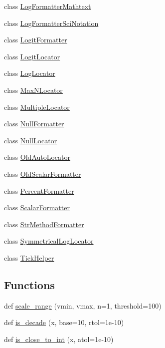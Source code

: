 \begin{DoxyCompactItemize}
\item 
class \hyperlink{classmatplotlib_1_1ticker_1_1LogFormatterMathtext}{Log\+Formatter\+Mathtext}
\item 
class \hyperlink{classmatplotlib_1_1ticker_1_1LogFormatterSciNotation}{Log\+Formatter\+Sci\+Notation}
\item 
class \hyperlink{classmatplotlib_1_1ticker_1_1LogitFormatter}{Logit\+Formatter}
\item 
class \hyperlink{classmatplotlib_1_1ticker_1_1LogitLocator}{Logit\+Locator}
\item 
class \hyperlink{classmatplotlib_1_1ticker_1_1LogLocator}{Log\+Locator}
\item 
class \hyperlink{classmatplotlib_1_1ticker_1_1MaxNLocator}{Max\+N\+Locator}
\item 
class \hyperlink{classmatplotlib_1_1ticker_1_1MultipleLocator}{Multiple\+Locator}
\item 
class \hyperlink{classmatplotlib_1_1ticker_1_1NullFormatter}{Null\+Formatter}
\item 
class \hyperlink{classmatplotlib_1_1ticker_1_1NullLocator}{Null\+Locator}
\item 
class \hyperlink{classmatplotlib_1_1ticker_1_1OldAutoLocator}{Old\+Auto\+Locator}
\item 
class \hyperlink{classmatplotlib_1_1ticker_1_1OldScalarFormatter}{Old\+Scalar\+Formatter}
\item 
class \hyperlink{classmatplotlib_1_1ticker_1_1PercentFormatter}{Percent\+Formatter}
\item 
class \hyperlink{classmatplotlib_1_1ticker_1_1ScalarFormatter}{Scalar\+Formatter}
\item 
class \hyperlink{classmatplotlib_1_1ticker_1_1StrMethodFormatter}{Str\+Method\+Formatter}
\item 
class \hyperlink{classmatplotlib_1_1ticker_1_1SymmetricalLogLocator}{Symmetrical\+Log\+Locator}
\item 
class \hyperlink{classmatplotlib_1_1ticker_1_1TickHelper}{Tick\+Helper}
\end{DoxyCompactItemize}
\subsection*{Functions}
\begin{DoxyCompactItemize}
\item 
def \hyperlink{namespacematplotlib_1_1ticker_ac41f01eb9c9d35af5c5c4dbd78aa230d}{scale\+\_\+range} (vmin, vmax, n=1, threshold=100)
\item 
def \hyperlink{namespacematplotlib_1_1ticker_a154b64486fe7bba1095ff01d22da0f22}{is\+\_\+decade} (x, base=10, rtol=1e-\/10)
\item 
def \hyperlink{namespacematplotlib_1_1ticker_a1a1c817c485736b5b5596df17b647d11}{is\+\_\+close\+\_\+to\+\_\+int} (x, atol=1e-\/10)
\end{DoxyCompactItemize}


